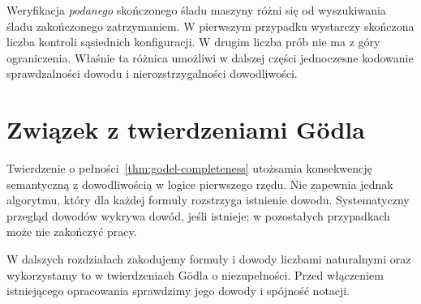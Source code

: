 \begin{uwaga}
Weryfikacja \emph{podanego} skończonego śladu maszyny
różni się od wyszukiwania śladu zakończonego zatrzymaniem.
W pierwszym przypadku wystarczy skończona liczba
kontroli sąsiednich konfiguracji. W drugim liczba
prób nie ma z góry ograniczenia. Właśnie ta różnica
umożliwi w dalszej części jednoczesne kodowanie
sprawdzalności dowodu i nierozstrzygalności dowodliwości.
\end{uwaga}

\section{Związek z twierdzeniami Gödla}
Twierdzenie o pełności~\ref{thm:godel-completeness} utożsamia
konsekwencję semantyczną z dowodliwością w logice pierwszego rzędu.
Nie zapewnia jednak algorytmu, który dla każdej formuły
rozstrzyga istnienie dowodu. Systematyczny przegląd dowodów
wykrywa dowód, jeśli istnieje; w pozostałych przypadkach
może nie zakończyć pracy.

W dalszych rozdziałach zakodujemy formuły i dowody liczbami
naturalnymi oraz wykorzystamy to w twierdzeniach Gödla
o niezupełności. Przed włączeniem istniejącego opracowania
sprawdzimy jego dowody i spójność notacji.